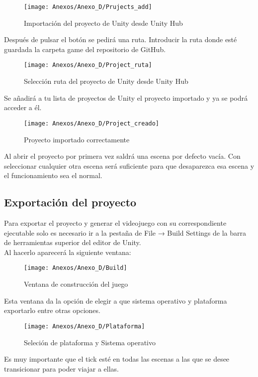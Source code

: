 \begin{figure}[h]
\centering
\texttt{[image: Anexos/Anexo\_D/Prujects\_add]}
\caption{Importación del proyecto de Unity desde Unity Hub}
\end{figure}
\clearpage

Después de pulsar el botón se pedirá una ruta. Introducir la ruta donde esté guardada la carpeta game del repositorio de GitHub.

\begin{figure}[h]
\centering
\texttt{[image: Anexos/Anexo\_D/Project\_ruta]}
\caption{Selección ruta del proyecto de Unity desde Unity Hub}
\end{figure}

Se añadirá a tu lista de proyectos de Unity el proyecto importado y ya se podrá acceder a él.

\begin{figure}[h]
\centering
\texttt{[image: Anexos/Anexo\_D/Project\_creado]}
\caption{Proyecto importado correctamente}
\end{figure}

Al abrir el proyecto por primera vez saldrá una escena por defecto vacía. Con seleccionar cualquier otra escena será suficiente para que desaparezca esa escena y el funcionamiento sea el normal.

\subsection{Exportación del proyecto}
Para exportar el proyecto y generar el videojuego con su correspondiente ejecutable solo es necesario ir a la pestaña de File → Build Settings de la barra de herramientas superior del editor de Unity.\\
Al hacerlo aparecerá la siguiente ventana:

\begin{figure}[h]
\centering
\texttt{[image: Anexos/Anexo\_D/Build]}
\caption{Ventana de construcción del juego}
\end{figure}

Esta ventana da la opción de elegir a que sistema operativo y plataforma exportarlo entre otras opciones.

\begin{figure}[h]
\centering
\texttt{[image: Anexos/Anexo\_D/Plataforma]}
\caption{Seleción de plataforma y Sistema operativo}
\end{figure}

Es muy importante que el tick esté en todas las escenas a las que se desee transicionar para poder viajar a ellas.

